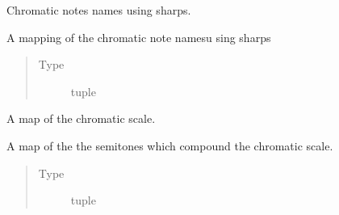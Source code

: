 \documentclass[letterpaper,10pt,english]{sphinxmanual}
\begin{document}
\begin{fulllineitems}
\label{\detokenize{birdears:birdears.CHROMATIC_SHARP}}
\sphinxAtStartPar
Chromatic notes names using sharps.

\sphinxAtStartPar
A mapping of the chromatic note namesu sing sharps
\begin{quote}\begin{description}
\item[{Type}] \leavevmode
\sphinxAtStartPar
tuple

\end{description}\end{quote}

\end{fulllineitems}


\begin{fulllineitems}
\label{\detokenize{birdears:birdears.CHROMATIC_TYPE}}
\sphinxAtStartPar
A map of the chromatic scale.

\sphinxAtStartPar
A map of the the semitones which compound the chromatic scale.
\begin{quote}\begin{description}
\item[{Type}] \leavevmode
\sphinxAtStartPar
tuple

\end{description}\end{quote}

\end{fulllineitems}

\end{document}
